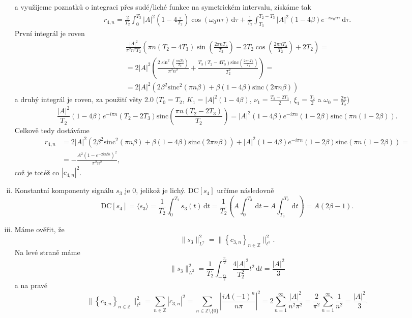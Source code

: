 \documentclass{article}
\begin{document}
\begin{enumerate}[(i)]
\begin{align*}
\end{align*}
a využijeme poznatků o integraci přes sudé/liché funkce na symetrickém intervalu, získáme tak
\begin{align*}
    r_{4,n}=\frac{2}{T_2}\int_{0}^{T_3} |A|^2 \left(1-4\frac{\tau}{T_2}\right)\cos(\omega_0 n \tau)\,\mathrm{d}\tau +\frac{1}{T_2}\int_{T_3}^{T_2-T_3} |A|^2 \left(1-4\beta\right)e^{-i\omega_0 n \tau}\,\mathrm{d}\tau.
\end{align*}
První integrál je roven
\begin{align*}
    \frac{|A|^2}{\pi^2 n^2 T_2} \left(\pi  n \left(T_2-4 T_3\right) \sin \left(\frac{2 \pi  n T_3}{T_2}\right)-2 T_2 \cos \left(\frac{2 \pi  n T_3}{T_2}\right)+2 T_2\right) = \\ = 2|A|^2 \left(\frac{2 \sin ^2\left(\frac{\pi  n T_3}{T_2}\right)}{\pi ^2 n^2}+\frac{T_3 \left(T_2-4 T_3\right) \text{sinc}\left(\frac{2 \pi  n T_3}{T_2}\right)}{T_2^2}\right) = \\ = 2|A|^2 \left(2\beta^2\text{sinc}^2(\pi n\beta) + \beta (1-4\beta)\text{sinc}(2\pi n \beta)\right)
\end{align*}
a druhý integrál je roven, za použití věty 2.0 ($T_0 = T_2$, $K_1 = |A|^2(1-4\beta)$, $\nu_1 = \frac{T_2 - 2T_3}{2}$, $\xi_1 = \frac{T_2}{2}$ a $\omega_0 = \frac{2 \pi}{T_2}$)
\[
    \frac{|A|^2}{T_2} (1-4 \beta ) e^{-i \pi  n} \left(T_2-2 T_3\right) \text{sinc}\left(\frac{\pi  n \left(T_2-2 T_3\right)}{T_2}\right) = |A|^2 (1-4 \beta ) e^{-i \pi  n} \left(1-2 \beta\right) \text{sinc}\left(\pi  n \left(1-2\beta \right)\right).
\]
\newpage
Celkově tedy dostáváme
\begin{align*}
    r_{4,n} &= 2|A|^2 \left(2\beta^2\text{sinc}^2(\pi n\beta) + \beta (1-4\beta)\text{sinc}(2\pi n \beta)\right) +|A|^2 (1-4 \beta ) e^{-i \pi  n} \left(1-2 \beta\right) \text{sinc}\left(\pi  n \left(1-2\beta \right)\right) = \\ &= -\frac{A^2 \left(1-e^{-2 i \pi  \beta  n}\right)^2}{\pi ^2 n^2},
\end{align*}
což je totéž co $|c_{4,n}|^2$.
\item Konstantní komponenty signálu $s_3$ je $0$, jelikož je lichý. $\text{DC}\left[s_4\right]$ určíme následovně
\[
    \text{DC}\left[s_4 \right] = \langle s_3 \rangle = \frac{1}{T_2} \int_{0}^{T_2} s_3(t)\,\mathrm{d}t = \frac{1}{T_2}\left(A\int_{0}^{T_3}\,\mathrm{d}t -A\int_{T_3}^{T_2}\,\mathrm{d}t \right) = A(2\beta-1).
\]
\item Máme ověřit, že
\[
    \lVert s_3\rVert_{L^2}^2 = \lVert \left\{ c_{3, n}\right\}_{n\in \mathbb{Z}}\rVert_{\ell^2}^2.
\]
Na levé straně máme
\[
   \lVert s_3\rVert_{L^2}^2= \frac{1}{T_2}\int_{-\frac{T_2}{2}}^{\frac{T_2}{2}} \frac{4|A|^2}{T_2^2} t^2\,\mathrm{d}t = \frac{|A|^2}{3}
\]
a na pravé
\[
    \lVert \left\{ c_{3, n}\right\}_{n\in \mathbb{Z}}\rVert_{\ell^2}^2 = \sum_{n \in \mathbb{Z}} |c_{3,n}|^2 = \sum_{n \in \mathbb{Z} \setminus \{0\}} \left|\frac{iA (-1)^n}{n \pi}\right|^2 = 2\sum_{n=1}^{\infty} \frac{|A|^2}{n^2 \pi^2} = \frac{2}{\pi^2}\sum_{n=1}^{\infty}\frac{1}{n^2} = \frac{|A|^2}{3}.
\]


\end{enumerate}
\end{document}
